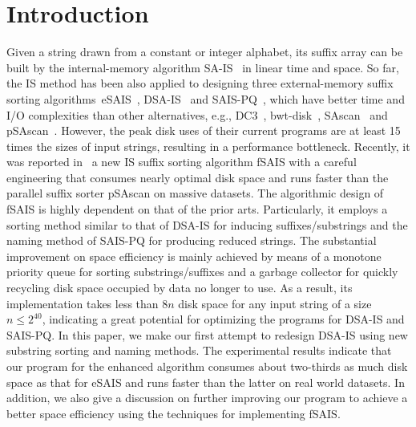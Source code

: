 \documentclass[10pt,journal,compsoc]{IEEEtran}
\begin{document}
\maketitle

\IEEEdisplaynontitleabstractindextext

\IEEEpeerreviewmaketitle

\section{Introduction}\label{sec:introduction}

Given a string drawn from a constant or integer alphabet, its suffix array can be built by the internal-memory algorithm SA-IS~\cite{Nong11} in linear time and space. So far, the IS method has been also applied to designing three external-memory suffix sorting algorithms~eSAIS~\cite{Bingmann12}, DSA-IS~\cite{Nong15} and SAIS-PQ~\cite{Liu15}, which have better time and I/O complexities than other alternatives, e.g., DC3~\cite{Dementiev2008a}, bwt-disk~\cite{Ferragina2012}, SAscan~\cite{Karkkainen2014} and pSAscan~\cite{Karkkainen2015}. However, the peak disk uses of their current programs are at least 15 times the sizes of input strings, resulting in a performance bottleneck. Recently, it was reported in~\cite{Karkkainen2017} a new IS suffix sorting algorithm fSAIS with a careful engineering that consumes nearly optimal disk space and runs faster than the parallel suffix sorter pSAscan on massive datasets. The algorithmic design of fSAIS is highly dependent on that of the prior arts. Particularly, it employs a sorting method similar to that of DSA-IS for inducing suffixes/substrings and the naming method of SAIS-PQ for producing reduced strings. The substantial improvement on space efficiency is mainly achieved by means of a monotone priority queue  for sorting substrings/suffixes and a garbage collector for quickly recycling disk space occupied by data no longer to use. As a result, its implementation takes less than $8n$ disk space for any input string of a size $n \le 2^{40}$, indicating a great potential for optimizing the programs for DSA-IS and SAIS-PQ. In this paper, we make our first attempt to redesign DSA-IS using new substring sorting and naming methods. The experimental results indicate that our program for the enhanced algorithm consumes about two-thirds as much disk space as that for eSAIS and runs faster than the latter on real world datasets. In addition, we also give a discussion on further improving our program to achieve a better space efficiency using the techniques for implementing fSAIS.
\end{document}
